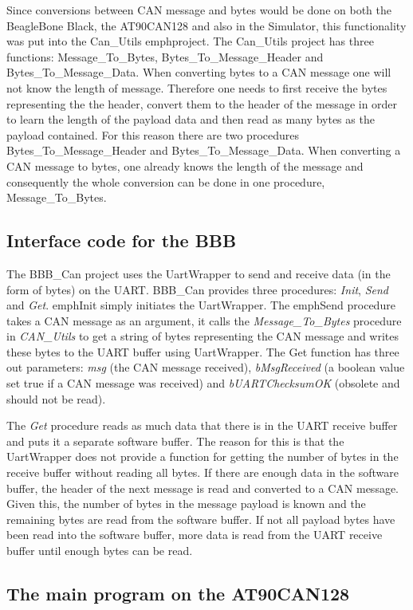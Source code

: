 Since conversions between CAN message and bytes would be done on both the BeagleBone Black, the AT90CAN128 and also in the Simulator, this functionality was put into the Can\_Utils emph{project}. \newline
The Can\_Utils project has three functions: Message\_To\_Bytes, Bytes\_To\_Message\_Header and Bytes\_To\_Message\_Data.  \newline
When converting bytes to a CAN message one will not know the length of message. Therefore one needs to first receive the bytes representing the the header, convert them to the header of the message in order to learn the length of the payload data and then read as many bytes as the payload contained. \newline
For this reason there are two procedures Bytes\_To\_Message\_Header and Bytes\_To\_Message\_Data.  \newline
When converting a CAN message to bytes, one already knows the length of the message and consequently the whole conversion can be done in one procedure, Message\_To\_Bytes.

\subsection{Interface code for the BBB}
The BBB\_Can project uses the UartWrapper to send and receive data (in the form of bytes) on the UART. BBB\_Can provides three procedures: \emph{Init}, \emph{Send} and \emph{Get}. \newline
emph{Init} simply initiates the UartWrapper. \newline
The emph{Send} procedure takes a CAN message as an argument, it calls the \emph{Message\_To\_Bytes} procedure in \emph{CAN\_Utils} to get a string of bytes representing the CAN message and writes these bytes to the UART buffer using UartWrapper. \newline
The Get function has three out parameters: \emph{msg} (the CAN message received), \emph{bMsgReceived} (a boolean value set true if a CAN message was received) and \emph{bUARTChecksumOK} (obsolete and should not be read). 

The \emph{Get} procedure reads as much data that there is in the UART receive buffer and puts it a separate software buffer. The reason for this is that the UartWrapper does not provide a function for getting the number of bytes in the receive buffer without reading all bytes. \newline
If there are enough data in the software buffer, the header of the next message is read and converted to a CAN message. Given this, the number of bytes in the message payload is known and the remaining bytes are read from the software buffer. If not all payload bytes have been read into the software buffer, more data is read from the UART receive buffer until enough bytes can be read.


\subsection{The main program on the AT90CAN128}
